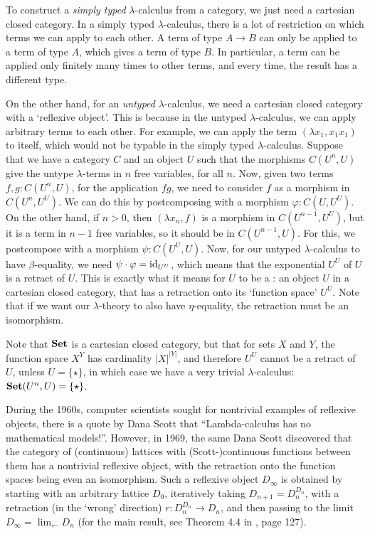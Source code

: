 \begin{remark}
  To construct a \textit{simply typed} $ \lambda $-calculus from a category, we just need a cartesian closed category. In a simply typed $ \lambda $-calculus, there is a lot of restriction on which terms we can apply to each other. A term of type $ A \to B $ can only be applied to a term of type $ A $, which gives a term of type $ B $. In particular, a term can be applied only finitely many times to other terms, and every time, the result has a different type.

  On the other hand, for an \textit{untyped} $ \lambda $-calculus, we need a cartesian closed category with a `reflexive object'. This is because in the untyped $ \lambda $-calculus, we can apply arbitrary terms to each other. For example, we can apply the term $ (\lambda x_1, x_1 x_1) $ to itself, which would not be typable in the simply typed $ \lambda $-calculus. Suppose that we have a category $ C $ and an object $ U $ such that the morphisms $ C(U^n, U) $ give the untype $ \lambda $-terms in $ n $ free variables, for all $ n $. Now, given two terms $ f, g : C(U^n, U) $, for the application $ f g $, we need to consider $ f $ as a morphism in $ C(U^n, U^U) $. We can do this by postcomposing with a morphism $ \varphi: C(U, U^U) $. On the other hand, if $ n > 0 $, then $ (\lambda x_n, f) $ is a morphism in $ C(U^{n - 1}, U^U) $, but it is a term in $ n - 1 $ free variables, so it should be in $ C(U^{n - 1}, U) $. For this, we postcompose with a morphism $ \psi: C(U^U, U) $. Now, for our untyped $ \lambda $-calculus to have $ \beta $-equality, we need $ \psi \cdot \varphi = \text{id}_{U^U} $, which means that the exponential $ U^U $ of $ U $ is a retract of $ U $. This is exactly what it means for $ U $ to be a : an object $ U $ in a cartesian closed category, that has a retraction onto its `function space' $ U^U $. Note that if we want our $ \lambda $-theory to also have $ \eta $-equality, the retraction must be an isomorphism.

  Note that $ \mathbf{Set} $ is a cartesian closed category, but that for sets $ X $ and $ Y $, the function space $ X^Y $ has cardinality $ \vert X \vert^{\vert Y \vert} $, and therefore $ U^U $ cannot be a retract of $ U $, unless $ U = \{ \star \} $, in which case we have a very trivial $ \lambda $-calculus: $ \mathbf{Set}(U^n, U) = \{ \star \} $.

  During the 1960s, computer scientists sought for nontrivial examples of reflexive objects, there is a quote by Dana Scott that ``Lambda-calculus has no mathematical models!''\autocite{strachey}. However, in 1969, the same Dana Scott discovered that the category of (continuous) lattices with (Scott-)continuous functions between them has a nontrivial reflexive object, with the retraction onto the function spaces being even an isomorphism. Such a reflexive object $ D_\infty $ is obtained by starting with an arbitrary lattice $ D_0 $, iteratively taking $ D_{n + 1} = D_n^{D_n} $, with a retraction (in the `wrong' direction) $ r: D_n^{D_n} \to D_n $, and then passing to the limit $ D_\infty = \lim_{\leftarrow} D_n $ (for the main result, see Theorem 4.4 in \autocite{scott-continuous}, page 127).
\end{remark}

